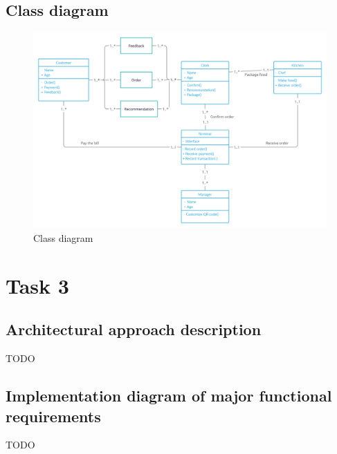 \documentclass[a4paper]{article}
\numberwithin{equation}{section}
\begin{document}
\subsection{Class diagram}
\begin{figure}[H]
  \centering
  \includegraphics[width=\textwidth]{./assets/t2/Task 2.3_SE.png}
  \caption{Class diagram}
\end{figure}

\newpage

\section{Task 3}
\subsection{Architectural approach description}
TODO

\subsection{Implementation diagram of major functional requirements}
TODO
\end{document}
